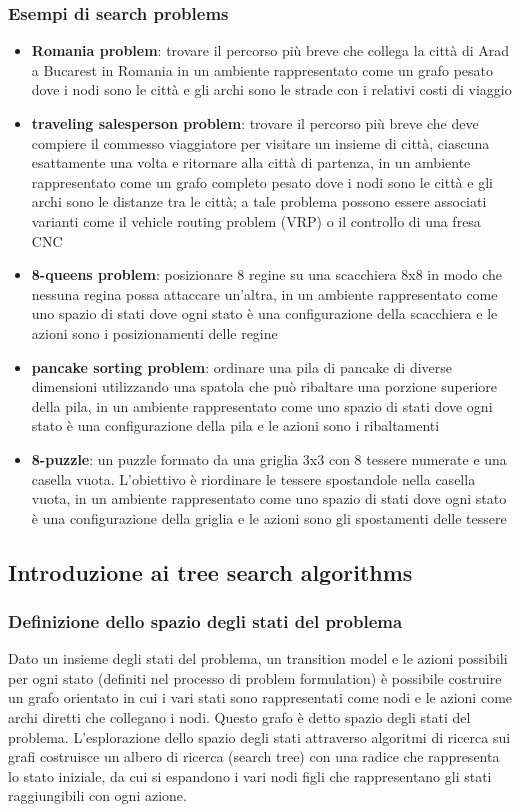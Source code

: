 \subsubsection*{Esempi di search problems}
\begin{itemize}
	\item \textbf{Romania problem}: trovare il percorso più breve che collega la città di Arad a Bucarest in Romania in un
	ambiente rappresentato come un grafo pesato dove i nodi sono le città e gli archi sono le strade con i relativi costi di
	viaggio
	\item \textbf{traveling salesperson problem}: trovare il percorso più breve che deve compiere il commesso viaggiatore per
	visitare un insieme di città, ciascuna esattamente una volta e ritornare alla città di partenza, in un ambiente rappresentato
	come un grafo completo pesato dove i nodi sono le città e gli archi sono le distanze tra le città; a tale problema possono
	essere associati varianti come il vehicle routing problem (VRP) o il controllo di una fresa CNC
	\item \textbf{8-queens problem}: posizionare 8 regine su una scacchiera 8x8 in modo che nessuna regina possa attaccare
	un'altra, in un ambiente rappresentato come uno spazio di stati dove ogni stato è una configurazione della scacchiera e le
	azioni sono i posizionamenti delle regine
	\item \textbf{pancake sorting problem}: ordinare una pila di pancake di diverse dimensioni utilizzando una spatola che può
	ribaltare una porzione superiore della pila, in un ambiente rappresentato come uno spazio di stati dove ogni stato è una
	configurazione della pila e le azioni sono i ribaltamenti
	\item \textbf{8-puzzle}: un puzzle formato da una griglia 3x3 con 8 tessere numerate e una casella vuota. L'obiettivo è
	riordinare le tessere spostandole nella casella vuota, in un ambiente rappresentato come uno spazio di stati dove ogni
	stato è una configurazione della griglia e le azioni sono gli spostamenti delle tessere
\end{itemize}


\subsection{Introduzione ai tree search algorithms}
\subsubsection*{Definizione dello spazio degli stati del problema}
Dato un insieme degli stati del problema, un transition model e le azioni possibili per ogni stato (definiti nel processo
di problem formulation) è possibile costruire un grafo orientato in cui i vari stati sono rappresentati come nodi e le azioni
come archi diretti che collegano i nodi. Questo grafo è detto spazio degli stati del problema. L'esplorazione dello spazio
degli stati attraverso algoritmi di ricerca sui grafi costruisce un albero di ricerca (search tree) con una radice che
rappresenta lo stato iniziale, da cui si espandono i vari nodi figli che rappresentano gli stati raggiungibili con ogni azione.

